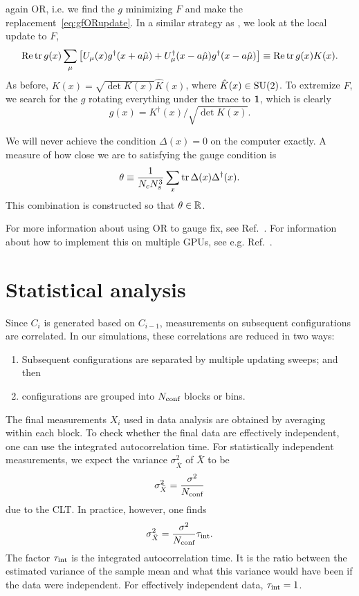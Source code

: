 again OR, i.e. we find the $g$ minimizing $F$ and make the
replacement~\eqref{eq:gfORupdate}. In a similar strategy as
, we look at the local update to $F$,
\begin{equation}
  \mathop{\mathrm{Re}}\tr g(x)\sum_\mu\left[U_\mu(x)g^\dagger(x+a\hat\mu)
                        +U_\mu^\dagger(x-a\hat\mu)g^\dagger(x-a\hat\mu)\right]
  \equiv\mathop{\mathrm{Re}}\tr g(x)K(x).
\end{equation}
As before, $K(x)=\sqrt{\det K(x)}\hat K(x)$, where $\hat K(x)\in\operatorname{SU}(2)$.
To extremize $F$, we search for the $g$ rotating everything under the
trace to ${\mathbf 1}$, which is clearly
\begin{equation}
  g(x)=K^\dagger(x)/\sqrt{\det K(x)}.
\end{equation} 

We will never achieve the condition $\Delta(x)=0$ on the computer exactly.
A measure of how close we are to satisfying the gauge condition is
\begin{equation}
  \theta\equiv\frac{1}{N_c N_s^3}\sum_x\tr\Delta(x)\Delta^\dagger(x).
\end{equation}
This combination is constructed so that $\theta\in\mathbb{R}$. 

For more information
about using OR to gauge fix, see Ref.~\cite{mandula_efficient_1990}. 
For information about how to implement this on multiple GPUs, see
e.g. Ref.~\cite{schrock_coulomb_2013}.

\section{Statistical analysis}\label{sec:statana}

Since $C_i$ is generated based on $C_{i-1}$, measurements on subsequent
configurations are correlated. In our simulations, these
correlations are reduced in two ways:
\begin{enumerate}
  \item Subsequent configurations are separated by multiple updating sweeps;
        and then
  \item configurations are grouped into $N_{\text{conf}}$ blocks or bins.
\end{enumerate}
The final measurements $X_i$ used in data analysis are obtained by averaging
within each block.
To check whether the final data are effectively independent, one can use
the integrated autocorrelation time. 
For statistically independent measurements, we expect the variance 
$\sigma^2_{\bar{X}}$ of $\bar{X}$ to be
\begin{equation}
  \sigma^2_{\bar{X}}=\frac{\sigma^2}{N_{\text{conf}}}
\end{equation}
due to the CLT. In practice, however, one finds 
\begin{equation}
  \sigma^2_{\bar{X}}=\frac{\sigma^2}{N_{\text{conf}}}\tau_\text{int}.
\end{equation}
The factor $\tau_\text{int}$ is the integrated autocorrelation time. It is the 
ratio between the estimated variance of the sample
mean and what this variance would have been if the data were independent.
For effectively independent data, $\tau_\text{int}=1$.

